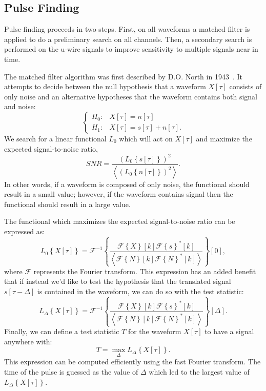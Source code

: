 \subsection{Pulse Finding}\label{sec:ReconPulseFinding}

Pulse-finding proceeds in two steps.  First, on all waveforms a matched filter is applied to do a preliminary search on all channels.  Then, a secondary search is performed on the u-wire signals to improve sensitivity to multiple signals near in time.

The matched filter algorithm was first described by D.O. North in 1943~\cite{MatchedFilterPaper}.  It attempts to decide between the null hypothesis that a waveform $X[\tau]$ consists of only noise and an alternative hypotheses that the waveform contains both signal and noise:
\begin{equation}\begin{cases}
H_0: & X[\tau] = n[\tau]\\
H_1: & X[\tau] = s[\tau] + n[\tau].
\end{cases}\end{equation}
We search for a linear functional $L_0$ which will act on $X[\tau]$ and maximize the expected signal-to-noise ratio,
\begin{equation}
SNR = \frac{\left(L_0\left\{s[\tau]\right\}\right)^2} {\left<\left(L_0\left\{n[\tau]\right\}\right)^2\right>}.
\end{equation}
In other words, if a waveform is composed of only noise, the functional should result in a small value; however, if the waveform contains signal then the functional should result in a large value.

The functional which maximizes the expected signal-to-noise ratio can be expressed as:
\begin{equation}
L_0\left\{X[\tau]\right\} = \mathcal{F}^{-1}\left\{ \frac{\mathcal{F}\left\{X\right\}[k] \mathcal{F}\left\{s\right\}^{*}[k]}{\left<\mathcal{F}\left\{N\right\}[k]\mathcal{F}\left\{N\right\}^{*}[k]\right>}\right\}[0],
\end{equation}
where $\mathcal{F}$ represents the Fourier transform.  This expression has an added benefit that if instead we'd like to test the hypothesis that the translated signal $s[\tau - \Delta]$ is contained in the waveform, we can do so with the test statistic:
\begin{equation}
L_\Delta\left\{X[\tau]\right\} = \mathcal{F}^{-1}\left\{ \frac{\mathcal{F}\left\{X\right\}[k] \mathcal{F}\left\{s\right\}^{*}[k]}{\left<\mathcal{F}\left\{N\right\}[k]\mathcal{F}\left\{N\right\}^{*}[k]\right>}\right\}[\Delta].
\end{equation}
Finally, we can define a test statistic $T$ for the waveform $X[\tau]$ to have a signal anywhere with:
\begin{equation}
T = \max_{\Delta} L_\Delta\left\{X[\tau]\right\}.
\end{equation}
This expression can be computed efficiently using the fast Fourier transform.  The time of the pulse is guessed as the value of $\Delta$ which led to the largest value of $L_\Delta\left\{X[\tau]\right\}$.

